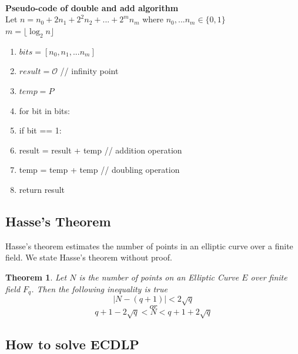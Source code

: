 \documentclass[a4paper,12pt]{report}
\newtheorem{theorem}{Theorem}
\begin{document}
\\\\\\
\textbf{Pseudo-code of double and add algorithm}\\
Let $n=n_0+2n_1+2^2n_2+...+2^mn_m$ where $n_0,...n_m \in \{0,1\}$\\$m =\lfloor \log_2 {n} \rfloor$
\begin{enumerate}
	\item $bits = [n_0,n_1,...n_m]$
	\item $result=\mathscr{O}$ \hspace{10mm} //  infinity point
	\item $temp=P$
	\item for bit in bits:
	\item \hspace{10mm}  if bit == 1:
	\item \hspace{10mm} \hspace{10mm}  result = result + temp \hspace{10mm}// addition operation
	\item \hspace{10mm} temp = temp + temp \hspace{10mm}  // doubling operation
	\item return result
\end{enumerate}
\subsection{Hasse's Theorem}
Hasse’s theorem estimates the number of points in an elliptic curve over a finite field. We state Hasse’s theorem without proof.
\begin{theorem}
	Let $N$ is the number of points on an Elliptic Curve $E$ over finite field $F_q$. Then the following inequality is true
	$$|N-(q+1)|<2\sqrt{q}$$
	$$or$$
	$$q+1-2\sqrt{q}<N<q+1+2\sqrt{q}$$
\end{theorem}

\subsection{How to solve ECDLP}
\end{document}
